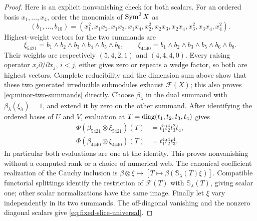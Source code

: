 \begin{proof}
Here is an explicit nonvanishing check for both scalars.  For an
ordered basis \(x_1,\ldots,x_4\), order the monomials of
\(\operatorname{Sym}^2X\) as
\[
 (b_1,\ldots,b_{10})=
 (x_1^2,x_1x_2,x_1x_3,x_1x_4,x_2^2,x_2x_3,
                  x_2x_4,x_3^2,x_3x_4,x_4^2).
\]
Highest-weight vectors for the two summands are
\[
 \xi_{5421}=b_1\wedge b_2\wedge b_3\wedge b_4\wedge b_5\wedge b_6,
 \qquad
 \xi_{4440}=b_1\wedge b_2\wedge b_3\wedge b_5\wedge b_6\wedge b_8.
\]
Their weights are respectively \((5,4,2,1)\) and \((4,4,4,0)\).
Every raising operator \(x_i\partial/\partial x_j\), \(i<j\),
either gives zero or repeats a wedge factor, so both are highest
vectors.  Complete reducibility and the dimension sum above show that
these two generated irreducible submodules exhaust \(\mathcal F(X)\);
this also proves \eqref{eq:minor-two-summands} directly.
Choose \(\beta_\lambda\) in the dual summand with
\(\beta_\lambda(\xi_\lambda)=1\), and extend it by zero on the
other summand.  After identifying the ordered bases of \(U\) and
\(V\), evaluation at \(T=\operatorname{diag}(t_1,t_2,t_3,t_4)\) gives
\begin{equation}\label{eq:two-block-nonvanishing}
 \begin{split}
 \Phi(\beta_{5421}\otimes\xi_{5421})(T)&=t_1^5t_2^4t_3^2t_4,\\
 \Phi(\beta_{4440}\otimes\xi_{4440})(T)&=t_1^4t_2^4t_3^4.
 \end{split}
\end{equation}
In particular both evaluations are one at the identity.  This proves
nonvanishing without a computed rank or a choice of numerical web.
The canonical coefficient realization of the Cauchy inclusion is
\(\beta\otimes\xi\mapsto[T\mapsto\beta(\mathbb S_\lambda(T)\xi)]\).
Compatible functorial splittings identify the restriction of
\(\mathcal F(T)\) with \(\mathbb S_\lambda(T)\), giving scalar one;
other scalar normalizations have the same image.  Finally let \(\xi\)
vary independently in its two summands.  The off-diagonal vanishing
and the nonzero diagonal scalars give \eqref{eq:fixed-slice-universal}.
\end{proof}

